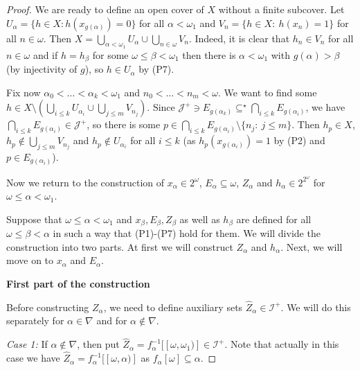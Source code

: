 \documentclass{amsart}
\theoremstyle{plain}
\theoremstyle{definition}
\theoremstyle{remark}
\newcommand{\cI}{\mathcal{I}}
\newcommand{\I}{\cI}
\newcommand{\cJ}{\mathcal{J}}
\newcommand{\J}{\cJ}
\begin{document}
\begin{proof}
We are ready to define an open cover of $X$ without a finite subcover. Let $U_\alpha=\{h\in X: h(x_{g(\alpha)})=0\}$ for all $\alpha<\omega_1$ and $V_n=\{h\in X:\ h(x_n)=1\}$ for all $n\in\omega$. Then $X=\bigcup_{\alpha<\omega_1} U_\alpha\cup\bigcup_{n\in\omega}V_n$. Indeed, it is clear that $h_n\in V_n$ for all $n\in\omega$ and if $h=h_\beta$ for some $\omega\leq\beta<\omega_1$ then there is $\alpha<\omega_1$ with $g(\alpha)>\beta$ (by injectivity of $g$), so $h\in U_\alpha$ by (P7). 

Fix now $\alpha_0<\ldots<\alpha_k<\omega_1$ and $n_0<\ldots<n_m<\omega$. We want to find some $h\in X\setminus(\bigcup_{i\leq k}U_{\alpha_i}\cup\bigcup_{j\leq m}V_{n_j})$. Since $\J^+\ni E_{g(\alpha_k)}\subseteq^\star\bigcap_{i\leq k}E_{g(\alpha_i)}$, we have $\bigcap_{i\leq k}E_{g(\alpha_i)}\in\J^+$, so there is some $p\in \bigcap_{i\leq k}E_{g(\alpha_i)}\setminus\{n_j:\ j\leq m\}$. Then $h_p\in X$, $h_p\notin\bigcup_{j\leq m}V_{n_j}$ and $h_p\notin U_{\alpha_i}$ for all $i\leq k$ (as $h_p(x_{g(\alpha_i)})=1$ by (P2) and $p\in E_{g(\alpha_i)}$). 

\medskip

Now we return to the construction of $x_\alpha\in 2^\omega$, $E_\alpha\subseteq\omega$, $Z_\alpha$ and $h_\alpha\in 2^{2^\omega}$ for $\omega\leq\alpha<\omega_1$.

Suppose that $\omega\leq\alpha<\omega_1$ and $x_\beta,E_\beta,Z_\beta$ as well as $h_\beta$ are defined for all $\omega\leq\beta < \alpha$ in such a way that (P1)-(P7) hold for them. We will divide the construction into two parts. At first we will construct $Z_\alpha$ and $h_\alpha$. Next, we will move on to $x_\alpha$ and $E_\alpha$.

\medskip

\textbf{First part of the construction}

\medskip

Before constructing $Z_\alpha$, we need to define auxiliary sets $\widehat{Z}_\alpha\in\I^+$. We will do this separately for $\alpha \in \nabla$ and for $\alpha \notin \nabla$.

\smallskip

\textit{Case 1:} If $\alpha \notin \nabla$, then put $\widehat{Z}_\alpha=f_\alpha^{-1}[[\omega,\omega_1)] \in \I^+$. Note that actually in this case we have  $\widehat{Z}_\alpha=f_\alpha^{-1}[[\omega,\alpha)]$ as $f_\alpha[\omega]\subseteq\alpha$.

\smallskip


\end{proof}
\end{document}
